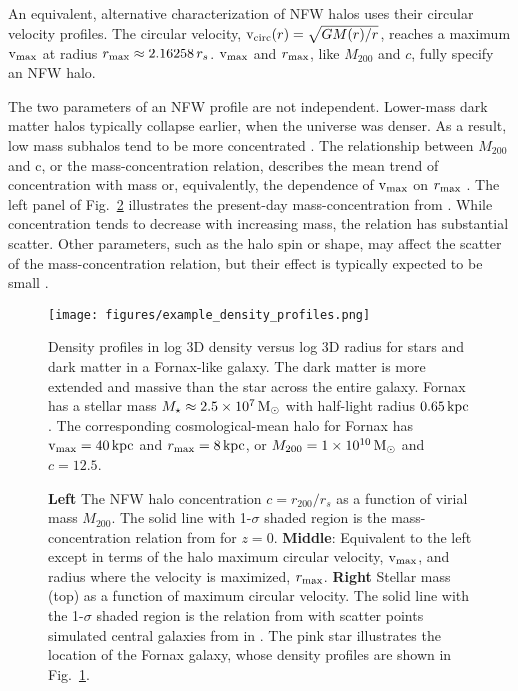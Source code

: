 An equivalent, alternative characterization of NFW halos uses their
circular velocity profiles. The circular velocity,
\({\rm v}_{\rm circ}(r) = \sqrt{G M(r) / r}\), reaches a maximum \({\rm v}_{\rm max}\) at radius
\(r_{\rm max} \approx 2.16258\,r_s\). \({\rm v}_{\rm max}\) and \(r_{\rm max}\), like
\(M_{200}\) and \(c\), fully specify an NFW halo.

The two parameters of an NFW profile are not independent. Lower-mass
dark matter halos typically collapse earlier, when the universe was
denser. As a result, low mass subhalos tend to be more concentrated
\citep[e.g.,][]{NFW1997}. The relationship between \(M_{200}\) and c, or
the mass-concentration relation, describes the mean trend of
concentration with mass or, equivalently, the dependence of \({\rm v}_{\rm max}\) on
\(r_{\rm max}\) \citep[e.g.,][]{bullock+2001, ludlow+2016}. The left panel of
Fig.~\ref{fig:smhm} illustrates the present-day mass-concentration from
\citet{ludlow+2016}. While concentration tends to decrease with
increasing mass, the relation has substantial scatter. Other parameters,
such as the halo spin or shape, may affect the scatter of the
mass-concentration relation, but their effect is typically expected to
be small \citep{navarro+2010, dicintio+2013, dutton+maccio2014}.

\begin{figure}
\centering
\texttt{[image: figures/example\_density\_profiles.png]}
\caption[Example dark matter and stellar density profiles]{Density
profiles in log 3D density versus log 3D radius for stars and dark
matter in a Fornax-like galaxy. The dark matter is more extended and
massive than the star across the entire galaxy. Fornax has a stellar
mass \(M_\star \approx 2.5\times10^7\,{\rm M}_{\odot}\) with half-light radius
\(0.65\,{\rm kpc}\) \citep{munoz+2018, woo+courteau+dekel2008}. The
corresponding cosmological-mean halo for Fornax has \({\rm v}_{\rm max}=40\,{\rm kpc}\)
and \(r_{\rm max}=8\,{\rm kpc}\), or \(M_{200} = 1\times10^{10}\,{\rm M}_{\odot}\) and
\(c=12.5\).}\label{fig:nfw_density}
\end{figure}

\begin{figure}
\centering
{}
\caption[Cosmological mass-concentration and stellar mass-halo mass
relations]{\textbf{Left} The NFW halo concentration \(c=r_{200} / r_s\)
as a function of virial mass \(M_{200}\). The solid line with
1-\(\sigma\) shaded region is the mass-concentration relation from
\citet{ludlow+2016} for \(z=0\). \textbf{Middle}: Equivalent to the left
except in terms of the halo maximum circular velocity, \({\rm v}_{\rm max}\), and
radius where the velocity is maximized, \(r_{\rm max}\). \textbf{Right}
Stellar mass (top) as a function of maximum circular velocity. The solid
line with the 1-\(\sigma\) shaded region is the relation from
\citet{fattahi+2018} with scatter points simulated central galaxies from
\apostle{} in \citet{fattahi+2018}. The pink star illustrates the
location of the Fornax galaxy, whose density profiles are shown in
Fig.~\ref{fig:nfw_density}.}\label{fig:smhm}
\end{figure}

